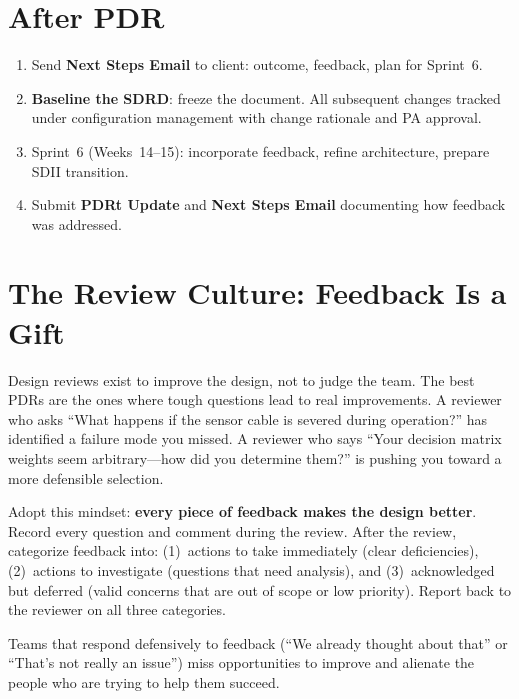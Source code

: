 \section{After PDR}
\begin{enumerate}[nosep,leftmargin=1.5em]
\item Send \textbf{Next Steps Email} to client: outcome, feedback, plan for Sprint~6.
\item \textbf{Baseline the SDRD}: freeze the document. All subsequent changes tracked under configuration management with change rationale and PA approval.
\item Sprint~6 (Weeks~14--15): incorporate feedback, refine architecture, prepare SDII transition.
\item Submit \textbf{PDRt Update} and \textbf{Next Steps Email} documenting how feedback was addressed.
\end{enumerate}

\section{The Review Culture: Feedback Is a Gift}
Design reviews exist to improve the design, not to judge the team. The best PDRs are the ones where tough questions lead to real improvements. A reviewer who asks ``What happens if the sensor cable is severed during operation?'' has identified a failure mode you missed. A reviewer who says ``Your decision matrix weights seem arbitrary---how did you determine them?'' is pushing you toward a more defensible selection.

Adopt this mindset: \textbf{every piece of feedback makes the design better}. Record every question and comment during the review. After the review, categorize feedback into: (1)~actions to take immediately (clear deficiencies), (2)~actions to investigate (questions that need analysis), and (3)~acknowledged but deferred (valid concerns that are out of scope or low priority). Report back to the reviewer on all three categories.

Teams that respond defensively to feedback (``We already thought about that'' or ``That's not really an issue'') miss opportunities to improve and alienate the people who are trying to help them succeed.

